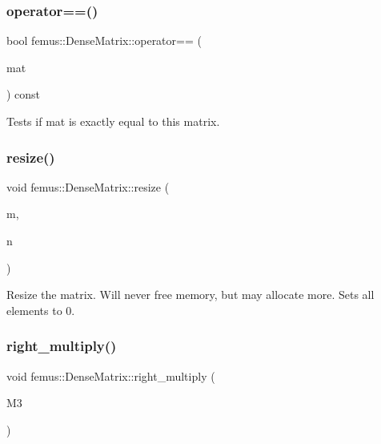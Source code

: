 \subsubsection{\texorpdfstring{operator==()}{operator==()}}
{\footnotesize\ttfamily bool femus\+::\+Dense\+Matrix\+::operator== (\begin{DoxyParamCaption}\item[{const \mbox{\hyperlink{classfemus_1_1_dense_matrix}{Dense\+Matrix}} \&}]{mat }\end{DoxyParamCaption}) const\hspace{0.3cm}{\ttfamily [inline]}}



Tests if {\ttfamily mat} is exactly equal to this matrix. 

\mbox{\label{classfemus_1_1_dense_matrix_a590507fcb543e7ac922099af9b066a38}} 
\subsubsection{\texorpdfstring{resize()}{resize()}}
{\footnotesize\ttfamily void femus\+::\+Dense\+Matrix\+::resize (\begin{DoxyParamCaption}\item[{const int}]{m,  }\item[{const int}]{n }\end{DoxyParamCaption})\hspace{0.3cm}{\ttfamily [inline]}}



Resize the matrix. Will never free memory, but may allocate more. Sets all elements to 0. 

\mbox{\label{classfemus_1_1_dense_matrix_a6de589e870d32a851fda1049b736bf99}} 
\subsubsection{\texorpdfstring{right\+\_\+multiply()}{right\_multiply()}}
{\footnotesize\ttfamily void femus\+::\+Dense\+Matrix\+::right\+\_\+multiply (\begin{DoxyParamCaption}\item[{const \mbox{\hyperlink{classfemus_1_1_dense_matrix_base}{Dense\+Matrix\+Base}} \&}]{M3 }\end{DoxyParamCaption})\hspace{0.3cm}{\ttfamily [virtual]}}




